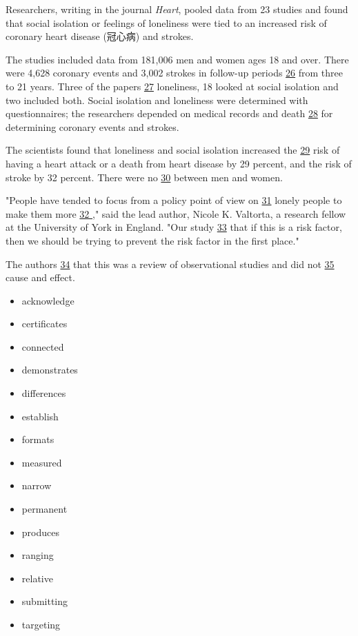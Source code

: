 \documentclass[UTF8,11pt]{ctexart}
\begin{document}
Researchers, writing in the journal \textit{Heart}, pooled data from 23 studies and found that social isolation or feelings of loneliness were tied to an increased risk of coronary heart disease (冠心病) and strokes.


The studies included data from 181,006 men and women ages 18 and over. There were 4,628 coronary events and 3,002 strokes in follow-up periods \uline{26} from three to 21 years. Three of the papers \uline{27} loneliness, 18 looked at social isolation and two included both. Social isolation and loneliness were determined with questionnaires; the researchers depended on medical records and death \uline{28} for determining coronary events and strokes.


The scientists found that loneliness and social isolation increased the \uline{29} risk of having a heart attack or a death from heart disease by 29 percent, and the risk of stroke by 32 percent. There were no \uline{30} between men and women.


"People have tended to focus from a policy point of view on \uline{31} lonely people to make them more \uline{32 }," said the lead author, Nicole K. Valtorta, a research fellow at the University of York in England. "Our study \uline{33} that if this is a risk factor, then we should be trying to prevent the risk factor in the first place."


The authors \uline{34} that this was a review of observational studies and did not \uline{35} cause and effect.


\begin{itemize}[leftmargin=2em,itemsep=.2em,topsep=.4em]\item[A.] acknowledge
\item[B.] certificates
\item[C.] connected
\item[D.] demonstrates
\item[E.] differences
\item[F.] establish
\item[G.] formats
\item[H.] measured
\item[I.] narrow
\item[J.] permanent
\item[K.] produces
\item[L.] ranging
\item[M.] relative
\item[N.] submitting
\item[O.] targeting
\end{itemize}
\end{document}
